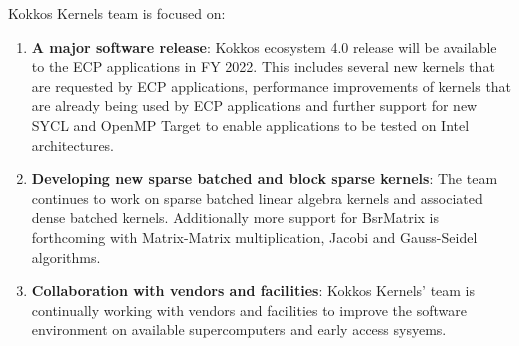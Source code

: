 Kokkos Kernels team is focused on:
\begin{enumerate}
	\item \textbf{A major software release}: Kokkos ecosystem 4.0 release 
	will be available to the ECP applications in FY 2022. This includes several new 
	kernels that are requested by ECP applications, performance improvements of
	kernels that are already being used by ECP applications and further support for
        new SYCL and OpenMP Target to enable applications to be tested on Intel architectures.
	\item \textbf{Developing new sparse batched and block sparse kernels}: The team continues
        to work on sparse batched linear algebra kernels and associated dense batched kernels.
        Additionally more support for BsrMatrix is forthcoming with Matrix-Matrix multiplication,
        Jacobi and Gauss-Seidel algorithms.
	\item \textbf{Collaboration with vendors and facilities}: Kokkos Kernels' team is
        continually working with vendors and facilities to improve the software environment
        on available supercomputers and early access sysyems.
\end{enumerate}
